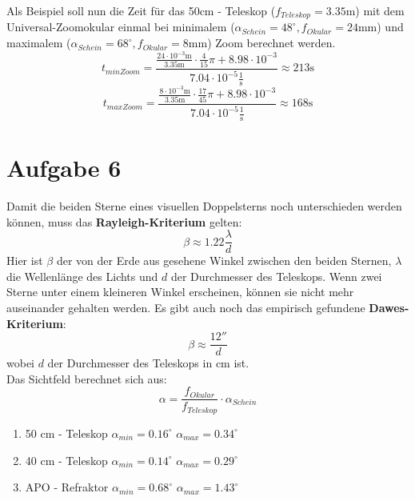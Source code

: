 Als Beispiel soll nun die Zeit für das 50cm - Teleskop ($f_{Teleskop} = 3.35\mathrm{m}$) mit dem Universal-Zoomokular einmal bei minimalem ($\alpha_{Schein}=48^{\circ}, f_{Okular} = 24 \mathrm{mm}$) und maximalem ($\alpha_{Schein}=68^{\circ}, f_{Okular} = 8 \mathrm{mm}$) Zoom berechnet werden.
\begin{equation}
t_{minZoom} = \frac{\frac{24 \cdot 10^{-3} \mathrm{m}}{3.35 \mathrm{m}}\cdot \frac{4}{15}\pi + 8.98 \cdot 10^{-3}}{7.04\cdot 10^{-5} \frac{1}{\mathrm{s}}} \approx 213 \mathrm{s}
\end{equation}
\begin{equation}
t_{maxZoom} = \frac{\frac{8 \cdot 10^{-3} \mathrm{m}}{3.35 \mathrm{m}}\cdot \frac{17}{45}\pi + 8.98 \cdot 10^{-3}}{7.04\cdot 10^{-5} \frac{1}{\mathrm{s}}} \approx 168 \mathrm{s}
\end{equation}

\section{Aufgabe 6}
Damit die beiden Sterne eines visuellen Doppelsterns noch unterschieden werden können, muss das \textbf{Rayleigh-Kriterium} gelten:
\begin{equation}
\beta \approx 1.22\frac{\lambda}{d}
\end{equation}
Hier ist $\beta$ der von der Erde aus gesehene Winkel zwischen den beiden Sternen, $\lambda$ die Wellenlänge des Lichts und $d$ der Durchmesser des Teleskops. Wenn zwei Sterne unter einem kleineren Winkel erscheinen, können sie nicht mehr auseinander gehalten werden.
Es gibt auch noch das empirisch gefundene \textbf{Dawes-Kriterium}:
\begin{equation}
\beta \approx \frac{12''}{d}
\end{equation}
wobei $d$ der Durchmesser des Teleskops in cm ist.
\\
Das Sichtfeld berechnet sich aus:
\begin{equation}
\alpha = \frac{f_{Okular}}{f_{Teleskop}}\cdot \alpha_{Schein}
\end{equation}
\begin{enumerate}
\item
50 cm - Teleskop
$\alpha_{min} = 0.16^{\circ}$
$\alpha_{max} = 0.34^{\circ}$
\item
40 cm - Teleskop
$\alpha_{min} = 0.14^{\circ}$
$\alpha_{max} = 0.29^{\circ}$
\item
APO - Refraktor
$\alpha_{min} = 0.68^{\circ}$
$\alpha_{max} = 1.43^{\circ}$
\end{enumerate}




